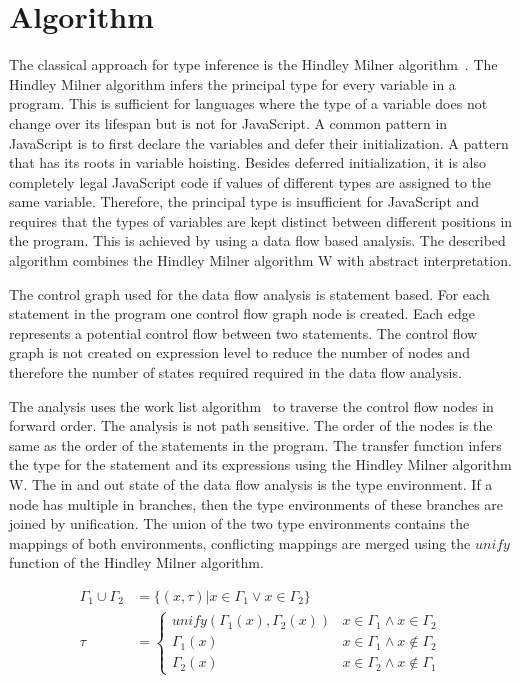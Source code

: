 \section{Algorithm}\label{sec:algorithm}
The classical approach for type inference is the Hindley Milner algorithm~\cite{Milner1978}. The Hindley Milner algorithm infers the principal type for every variable in a program. This is sufficient for languages where the type of a variable does not change over its lifespan but is not for JavaScript. A common pattern in JavaScript is to first declare the variables and defer their initialization. A pattern that has its roots in variable hoisting. Besides deferred initialization, it is also completely legal JavaScript code if values of different types are assigned to the same variable.  Therefore, the principal type is insufficient for JavaScript and requires that the types of variables are kept distinct between different positions in the program. This is achieved by using a data flow based analysis. The described algorithm combines the Hindley Milner algorithm W with abstract interpretation. 

The control graph used for the data flow analysis is statement based. For each statement in the program one control flow graph node is created. Each edge represents a potential control flow between two statements. The control flow graph is not created on expression level to reduce the number of nodes and therefore the number of states required required in the data flow analysis.  

The analysis uses the work list algorithm~\cite{NielsonNielsonHankin1999} to traverse the control flow nodes in forward order. The analysis is not path sensitive. The order of the nodes is the same as the order of the statements in the program. The transfer function infers the type for the statement and its expressions using the Hindley Milner algorithm W.  The in and out state of the data flow analysis is the type environment. If a node has multiple in branches, then the type environments of these branches are joined by unification. The union of the two type environments contains the mappings of both environments, conflicting mappings are merged using the $unify$ function of the Hindley Milner algorithm.

\begin{align*}
	\Gamma_1 \cup \Gamma_2 &= \lbrace (x, \tau) \vert x \in \Gamma_1 \vee x \in \Gamma_2 \rbrace \\
	\tau &= \begin{cases}
		unify(\Gamma_1(x), \Gamma_2(x)) & x \in \Gamma_1 \wedge x \in \Gamma_2 \\
		\Gamma_1(x) & x \in \Gamma_1 \wedge x \notin \Gamma_2 \\
		\Gamma_2(x) & x \in \Gamma_2\wedge x \notin \Gamma_1
	\end{cases}
\end{align*}

